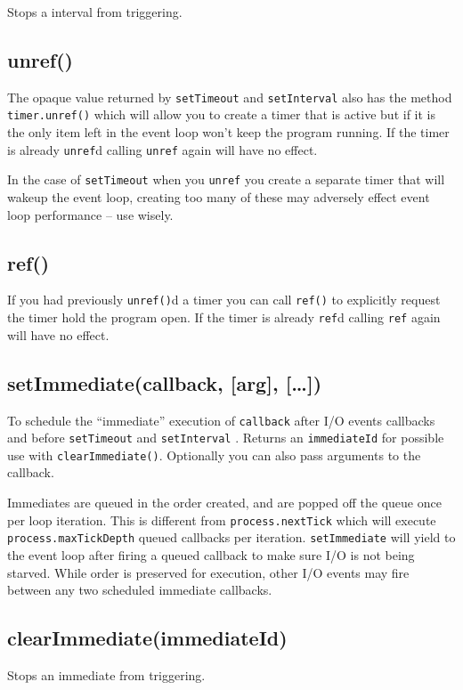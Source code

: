 Stops a interval from triggering.

\subsection{unref()}

The opaque value returned by \texttt{setTimeout} and
\texttt{setInterval} also has the method \texttt{timer.unref()} which
will allow you to create a timer that is active but if it is the only
item left in the event loop won't keep the program running. If the timer
is already \texttt{unref}d calling \texttt{unref} again will have no
effect.

In the case of \texttt{setTimeout} when you \texttt{unref} you create a
separate timer that will wakeup the event loop, creating too many of
these may adversely effect event loop performance -- use wisely.

\subsection{ref()}

If you had previously \texttt{unref()}d a timer you can call
\texttt{ref()} to explicitly request the timer hold the program open. If
the timer is already \texttt{ref}d calling \texttt{ref} again will have
no effect.

\subsection{setImmediate(callback, {[}arg{]}, {[}\ldots{}{]})}

To schedule the ``immediate'' execution of \texttt{callback} after I/O
events callbacks and before \texttt{setTimeout} and \texttt{setInterval}
. Returns an \texttt{immediateId} for possible use with
\texttt{clearImmediate()}. Optionally you can also pass arguments to the
callback.

Immediates are queued in the order created, and are popped off the queue
once per loop iteration. This is different from
\texttt{process.nextTick} which will execute
\texttt{process.maxTickDepth} queued callbacks per iteration.
\texttt{setImmediate} will yield to the event loop after firing a queued
callback to make sure I/O is not being starved. While order is preserved
for execution, other I/O events may fire between any two scheduled
immediate callbacks.

\subsection{clearImmediate(immediateId)}

Stops an immediate from triggering.
